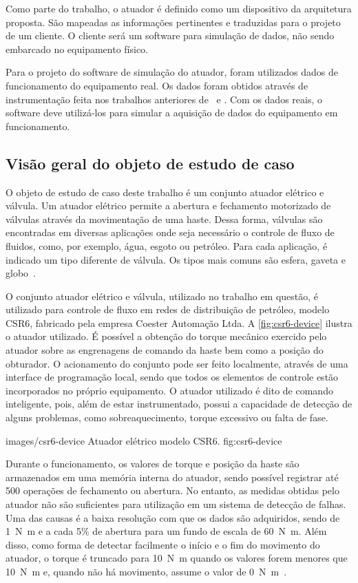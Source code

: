 Como parte do trabalho, o atuador é definido como um dispositivo da arquitetura proposta. São
mapeadas as informações pertinentes e traduzidas para o projeto de um cliente. O cliente será um
software para simulação de dados, não sendo embarcado no equipamento físico.

Para o projeto do software de simulação do atuador, foram utilizados dados de funcionamento do
equipamento real. Os dados foram obtidos através de instrumentação feita nos trabalhos anteriores
de~\cite{boesch2011deteccao} e \cite{faccin2011manutencao}. Com os dados reais, o software deve
utilizá-los para simular a aquisição de dados do equipamento em funcionamento.


\subsection{Visão geral do objeto de estudo de caso}

O objeto de estudo de caso deste trabalho é um conjunto atuador elétrico e válvula. Um atuador
elétrico permite a abertura e fechamento motorizado de válvulas através da movimentação de uma
haste. Dessa forma, válvulas são encontradas em diversas aplicações onde seja necessário o controle
de fluxo de fluidos, como, por exemplo, água, esgoto ou petróleo. Para cada aplicação, é indicado um
tipo diferente de válvula. Os tipos mais comuns são esfera, gaveta e
globo~\cite{campos2006controles}.

O conjunto atuador elétrico e válvula, utilizado no trabalho em questão, é utilizado para controle
de fluxo em redes de distribuição de petróleo, modelo CSR6, fabricado pela empresa Coester Automação
Ltda. A \cref{fig:csr6-device} ilustra o atuador utilizado. É possível a obtenção do torque mecânico
exercido pelo atuador sobre as engrenagens de comando da haste bem como a posição do obturador. O
acionamento do conjunto pode ser feito localmente, através de uma interface de programação local,
sendo que todos os elementos de controle estão incorporados no próprio equipamento. O atuador
utilizado é dito de comando inteligente, pois, além de estar instrumentado, possui a capacidade de
detecção de alguns problemas, como sobreaquecimento, torque excessivo ou falta de fase.

  {images/csr6-device}
  {Atuador elétrico modelo CSR6.}
  {fig:csr6-device}

Durante o funcionamento, os valores de torque e posição da haste são armazenados em uma memória
interna do atuador, sendo possível registrar até \num{500} operações de fechamento ou abertura. No
entanto, as medidas obtidas pelo atuador não são suficientes para utilização em um sistema de
detecção de falhas. Uma das causas é a baixa resolução com que os dados são adquiridos, sendo de
\SI{1}{\newton\meter} e a cada 5\% de abertura para um fundo de escala de \SI{60}{\newton\meter}.
Além disso, como forma de detectar facilmente o início e o fim do movimento do atuador, o torque é
truncado para \SI{10}{\newton\meter} quando os valores forem menores que \SI{10}{\newton\meter} e,
quando não há movimento, assume o valor de \SI{0}{\newton\meter}~\cite{lazzaretti2012avaliacao}.

